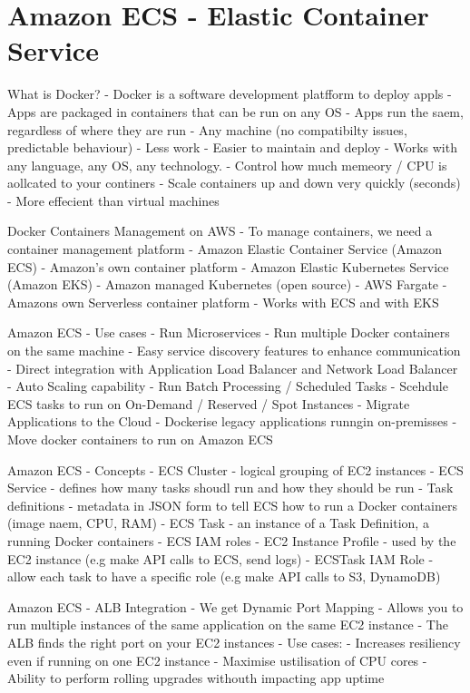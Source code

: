 \section{Amazon ECS - Elastic Container Service}
What is Docker?
- Docker is a software development platfform to deploy appls
- Apps are packaged in containers that can be run on any OS
- Apps run the saem, regardless of where they are run
- Any machine (no compatibilty issues, predictable behaviour)
- Less work
- Easier to maintain and deploy
- Works with any language, any OS, any technology.
- Control how much memeory / CPU is aollcated to your continers
- Scale containers up and down very quickly (seconds)
- More effecient than virtual machines

Docker Containers Management on AWS
- To manage containers, we need a container management platform
- Amazon Elastic Container Service (Amazon ECS)
- Amazon's own container platform
- Amazon Elastic Kubernetes Service (Amazon EKS)
- Amazon managed Kubernetes (open source)
- AWS Fargate
- Amazons own Serverless container platform
- Works with ECS and with EKS

Amazon ECS - Use cases
- Run Microservices
- Run multiple Docker containers on the same machine
- Easy service discovery features to enhance communication
- Direct integration with Application Load Balancer and Network Load Balancer
- Auto Scaling capability
- Run Batch Processing / Scheduled Tasks
- Scehdule ECS tasks to run on On-Demand / Reserved / Spot Instances
- Migrate Applications to the Cloud
- Dockerise legacy applications runngin on-premisses
- Move docker containers to run on Amazon ECS

Amazon ECS - Concepts
- ECS Cluster - logical grouping of EC2 instances
- ECS Service - defines how many tasks shoudl run and how they should be run
- Task definitions - metadata in JSON form to tell ECS how to run a Docker containers (image naem, CPU, RAM)
- ECS Task - an instance of a Task Definition, a running Docker containers
- ECS IAM roles
- EC2 Instance Profile - used by the EC2 instance (e.g make API calls to ECS, send logs)
- ECSTask IAM Role - allow each task to have a specific role (e.g make API calls to S3, DynamoDB)


Amazon ECS - ALB Integration
- We get Dynamic Port Mapping
- Allows you to run multiple instances of the same application on the same EC2 instance
- The ALB finds the right port on your EC2 instances
- Use cases:
- Increases resiliency even if running on one EC2 instance
- Maximise ustilisation of CPU cores
- Ability to perform rolling upgrades withouth impacting app uptime

